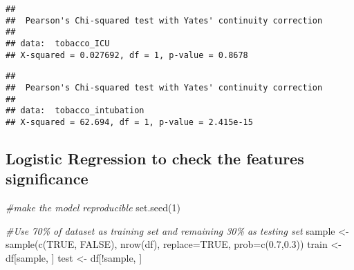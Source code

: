 \documentclass[
]{article}
\newenvironment{Shaded}{\begin{snugshade}}{\end{snugshade}}
\newcommand{\AttributeTok}[1]{\textcolor[rgb]{0.77,0.63,0.00}{#1}}
\newcommand{\CommentTok}[1]{\textcolor[rgb]{0.56,0.35,0.01}{\textit{#1}}}
\newcommand{\ConstantTok}[1]{\textcolor[rgb]{0.00,0.00,0.00}{#1}}
\newcommand{\DecValTok}[1]{\textcolor[rgb]{0.00,0.00,0.81}{#1}}
\newcommand{\FloatTok}[1]{\textcolor[rgb]{0.00,0.00,0.81}{#1}}
\newcommand{\FunctionTok}[1]{\textcolor[rgb]{0.00,0.00,0.00}{#1}}
\newcommand{\NormalTok}[1]{#1}
\newcommand{\OtherTok}[1]{\textcolor[rgb]{0.56,0.35,0.01}{#1}}
\newcommand{\SpecialCharTok}[1]{\textcolor[rgb]{0.00,0.00,0.00}{#1}}
\begin{document}
\begin{Shaded}
\end{Shaded}

\begin{verbatim}
## 
##  Pearson's Chi-squared test with Yates' continuity correction
## 
## data:  tobacco_ICU
## X-squared = 0.027692, df = 1, p-value = 0.8678
\end{verbatim}

\begin{Shaded}
\end{Shaded}

\begin{verbatim}
## 
##  Pearson's Chi-squared test with Yates' continuity correction
## 
## data:  tobacco_intubation
## X-squared = 62.694, df = 1, p-value = 2.415e-15
\end{verbatim}

\hypertarget{logistic-regression-to-check-the-features-significance}{%
\subsection{Logistic Regression to check the features
significance}\label{logistic-regression-to-check-the-features-significance}}

\begin{Shaded}
\begin{Highlighting}[]
\CommentTok{\#make the model reproducible}
\FunctionTok{set.seed}\NormalTok{(}\DecValTok{1}\NormalTok{)}

\CommentTok{\#Use 70\% of dataset as training set and remaining 30\% as testing set}
\NormalTok{sample }\OtherTok{\textless{}{-}} \FunctionTok{sample}\NormalTok{(}\FunctionTok{c}\NormalTok{(}\ConstantTok{TRUE}\NormalTok{, }\ConstantTok{FALSE}\NormalTok{), }\FunctionTok{nrow}\NormalTok{(df), }\AttributeTok{replace=}\ConstantTok{TRUE}\NormalTok{, }\AttributeTok{prob=}\FunctionTok{c}\NormalTok{(}\FloatTok{0.7}\NormalTok{,}\FloatTok{0.3}\NormalTok{))}
\NormalTok{train }\OtherTok{\textless{}{-}}\NormalTok{ df[sample, ]}
\NormalTok{test }\OtherTok{\textless{}{-}}\NormalTok{ df[}\SpecialCharTok{!}\NormalTok{sample, ] }
\end{Highlighting}
\end{Shaded}
\end{document}
